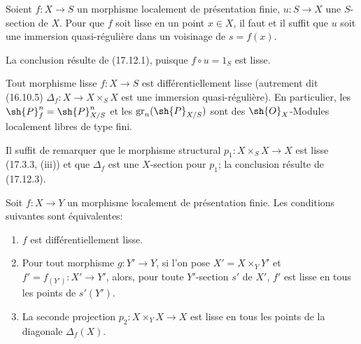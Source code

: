 \begin{corollary}[17.12.3]
\label{IV.17.12.3}
Soient $f:X\to S$ un morphisme localement de présentation finie, $u:S\to X$ une $S$-section de $X$. Pour que $f$ soit lisse en un point $x\in X$, il faut et il suffit que $u$ soit une immersion quasi-régulière dans un voisinage de $s=f(x)$.
\end{corollary}

La conclusion résulte de (17.12.1), puisque $f\circ u=1_S$ est lisse.

\begin{proposition}[17.12.4]
\label{IV.17.12.4}
Tout morphisme lisse $f:X\to S$ est différentiellement lisse \textup{(autrement dit (16.10.5) $\Delta_f:X\to X\times_SX$ est une immersion quasi-régulière)}. En particulier, les $\sh{P}_f^n=\sh{P}_{X/S}^n$ et les $\operatorname{gr}_n(\sh{P}_{X/S})$ sont des $\sh{O}_X$-Modules localement libres de type fini.
\end{proposition}

Il suffit de remarquer que le morphisme structural $p_1:X\times_SX\to X$ est lisse (17.3.3, (iii)) et que $\Delta_f$ est une $X$-section pour $p_1$; la conclusion résulte de (17.12.3).

\begin{proposition}[17.12.5]
\label{IV.17.12.5}
Soit $f:X\to Y$ un morphisme localement de présentation finie. Les conditions suivantes sont équivalentes:
\begin{enumerate}
  \item[\textup{a)}] $f$ est différentiellement lisse.
  \item[\textup{b)}] Pour tout morphisme $g:Y'\to Y$, si l'on pose $X'=X\times_Y Y'$ et $f'=f_{(Y')}:X'\to Y'$, alors, pour toute $Y'$-section $s'$ de $X'$, $f'$ est lisse en tous les points de $s'(Y')$.
  \item[\textup{c)}] La seconde projection $p_2:X\times_YX\to X$ est lisse en tous les points de la diagonale $\Delta_f(X)$.
\end{enumerate}
\end{proposition}

